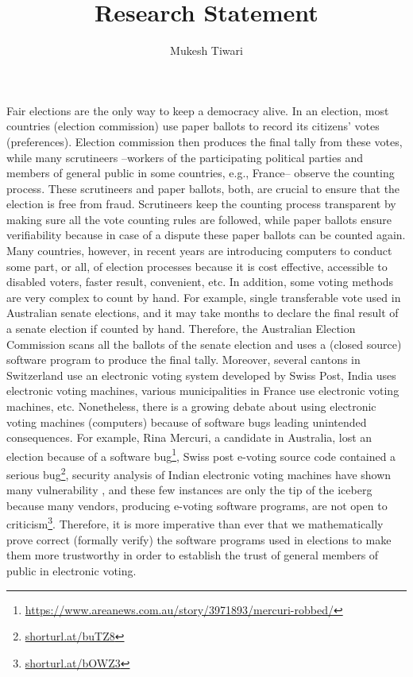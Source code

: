 \documentclass[a4paper]{article}
\title{Research Statement}
\author{Mukesh Tiwari}
\date{}
\begin{document}
\fontsize{12}{15}
\selectfont
\maketitle



Fair elections are the only way to keep a democracy alive. In an election, most countries (election commission) use paper ballots to record 
its citizens' votes (preferences). Election commission then produces the final tally from these votes, 
while many scrutineers --workers of the participating political parties and members of general 
public in some countries, e.g., France-- observe the counting process. 
These scrutineers and paper ballots, both, are crucial to ensure that 
the election is free from fraud. Scrutineers keep the counting process transparent by making sure all the vote counting 
rules are followed, while paper ballots ensure verifiability because in case of a dispute these paper ballots 
can be counted again. Many countries, however, in recent years are introducing computers to conduct some part, or all, of 
election processes because it is cost effective, accessible to disabled voters, faster result, convenient, etc. 
In addition, some voting methods are very complex to count by hand. For example,
single transferable vote used in Australian senate elections, and it may take months to declare the final result of 
a senate election if 
counted by hand. Therefore, the Australian Election Commission scans all the ballots of the senate election and 
uses a (closed source) software program to produce the final tally. Moreover, several cantons in Switzerland use an electronic 
voting system developed by Swiss Post, India uses electronic voting machines, various municipalities in France 
use electronic voting machines, etc.  Nonetheless, there is a growing debate about using electronic voting machines (computers)
because of software bugs leading unintended consequences. For example, Rina Mercuri, 
a candidate in Australia, lost an election because of 
a software bug\footnote{\url{https://www.areanews.com.au/story/3971893/mercuri-robbed/}}, 
Swiss post e-voting source code contained a serious 
bug\footnote{\url{shorturl.at/buTZ8}}, security analysis of Indian electronic 
voting machines have shown many vulnerability \cite{Wolchok:2010:SAI:1866307.1866309}, and 
these few instances are only the tip of the iceberg because many vendors, producing 
e-voting software programs, are not open to criticism\footnote{\url{shorturl.at/bOWZ3}}.
Therefore, it is more imperative than ever  that  we mathematically prove correct (formally verify)  the software programs 
used in elections to make them more trustworthy in order to establish the trust of general members of public
in electronic voting.
\end{document}
